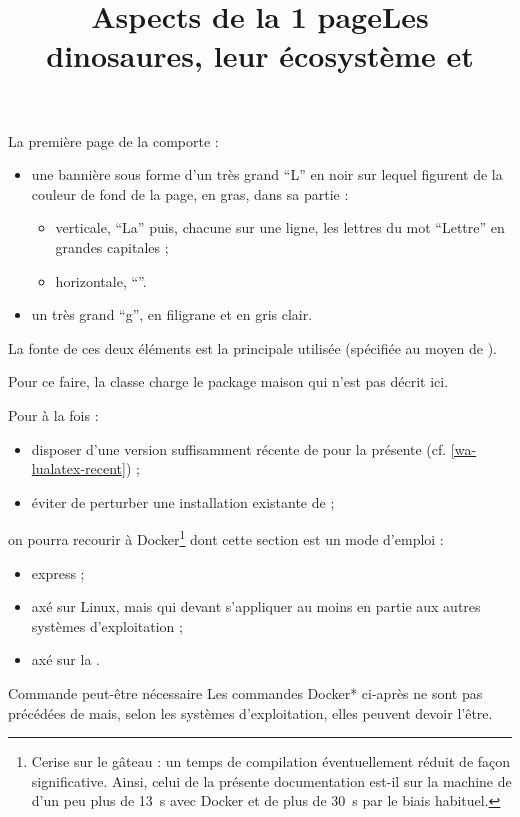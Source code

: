 \documentclass{letgut}
\def\docker{Docker}
\begin{document}
\title{Aspects de la 1\iere{} page}
\label{sec:mise-en-page}

La première page de la  comporte :
\begin{itemize}
\item une bannière sous forme d'un très grand \enquote{L} en noir sur lequel
  figurent de la couleur de fond de la page, en gras, dans sa partie :
  \begin{itemize}
  \item verticale, \enquote{La} puis, chacune sur une ligne, les lettres du mot
    \enquote{Lettre} en grandes capitales ;
  \item horizontale, \enquote{\gut}.
  \end{itemize}
\item un très grand \enquote{g}, en filigrane et en gris clair.
\end{itemize}
La fonte de ces deux éléments est la principale utilisée (spécifiée au moyen de
).

Pour ce faire, la classe charge le package maison  qui
n'est pas décrit ici.

\title{Les dinosaures, leur écosystème et }
\label{recours-docker}

Pour à la fois :
\begin{itemize}
\item disposer d'une version suffisamment récente de 
  pour la présente  (cf. \vref{wa-lualatex-recent}) ;
\item éviter de perturber une installation existante de  ;
\end{itemize}
on pourra recourir à \docker{}\footnote{Cerise sur le gâteau : un temps de
  compilation éventuellement réduit de façon significative. Ainsi, celui de la
  présente documentation est-il sur la machine de  d'un
  peu plus de \SI{13}{\s} avec \docker{} et de plus de \SI{30}{\s} par le biais
  habituel.} dont cette section est un mode d'emploi :
\begin{itemize}
\item express ;
\item axé sur Linux, mais qui devant s'appliquer au moins en partie aux autres
  systèmes d'exploitation ;
\item axé sur la \tl{}.
\end{itemize}

\begin{dbwarning}{Commande  peut-être nécessaire}{}
  Les commandes \docker*{} ci-après ne sont pas précédées de 
  mais, selon les systèmes d'exploitation, elles peuvent devoir l'être.
\end{dbwarning}
\end{document}
